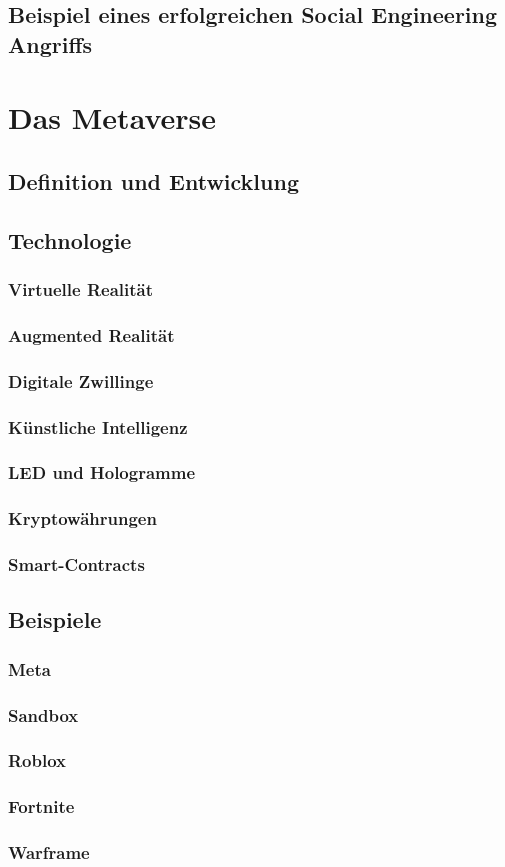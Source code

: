 \subsection{Beispiel eines erfolgreichen Social Engineering Angriffs}

\section{Das Metaverse}

\subsection{Definition und Entwicklung} %
\subsection{Technologie}

\subsubsection{Virtuelle Realität}
\subsubsection{Augmented Realität}
\subsubsection{Digitale Zwillinge}
\subsubsection{Künstliche Intelligenz}
\subsubsection{LED und Hologramme}
\subsubsection{Kryptowährungen}
\subsubsection{Smart-Contracts}

\subsection{Beispiele}

\subsubsection{Meta}
\subsubsection{Sandbox}
\subsubsection{Roblox}
\subsubsection{Fortnite}
\subsubsection{Warframe}